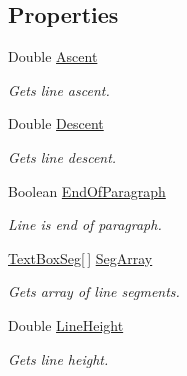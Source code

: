 \subsection*{Properties}
\begin{DoxyCompactItemize}
\item 
Double \hyperlink{class_pdf_file_writer_1_1_text_box_line_afd9f78cc965a804d90949cc6248a9ba6}{Ascent}
\begin{DoxyCompactList}\small\item\em Gets line ascent. \end{DoxyCompactList}\item 
Double \hyperlink{class_pdf_file_writer_1_1_text_box_line_a7b602f1425dc69a770c29f0edb5ef32b}{Descent}
\begin{DoxyCompactList}\small\item\em Gets line descent. \end{DoxyCompactList}\item 
Boolean \hyperlink{class_pdf_file_writer_1_1_text_box_line_a55fe55c5e4e298c7a4bda8f8b12ace06}{End\+Of\+Paragraph}
\begin{DoxyCompactList}\small\item\em Line is end of paragraph. \end{DoxyCompactList}\item 
\hyperlink{class_pdf_file_writer_1_1_text_box_seg}{Text\+Box\+Seg}\mbox{[}$\,$\mbox{]} \hyperlink{class_pdf_file_writer_1_1_text_box_line_ad11eacb2339dfa2b38412b7988431967}{Seg\+Array}
\begin{DoxyCompactList}\small\item\em Gets array of line segments. \end{DoxyCompactList}\item 
Double \hyperlink{class_pdf_file_writer_1_1_text_box_line_a6b43210707543188018991b0458e51ba}{Line\+Height}
\begin{DoxyCompactList}\small\item\em Gets line height. \end{DoxyCompactList}\end{DoxyCompactItemize}


